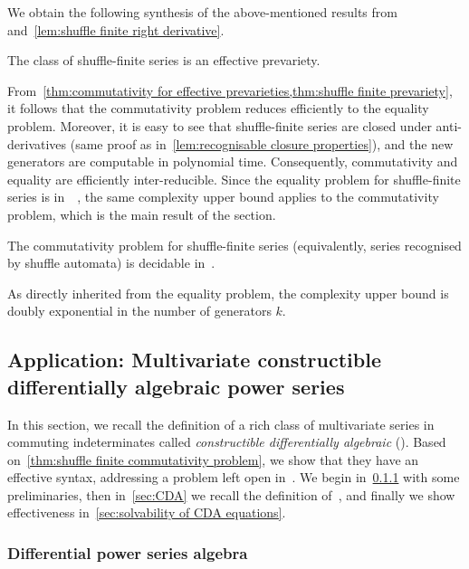 We obtain the following synthesis
of the above-mentioned results from~\cite{Clemente:CONCUR:2024}
and~\cref{lem:shuffle finite right derivative}.
%
\begin{theorem}
    \label{thm:shuffle finite prevariety}
    The class of shuffle-finite series is an effective prevariety.
\end{theorem}
%
\noindent
From~\cref{thm:commutativity for effective prevarieties,thm:shuffle finite prevariety},
it follows that the commutativity problem reduces efficiently to the equality problem.
%
Moreover, it is easy to see that shuffle-finite series are closed under anti-derivatives
(same proof as in~\cref{lem:recognisable closure properties}),
and the new generators are computable in polynomial time.
%
Consequently, commutativity and equality are efficiently inter-reducible.
%
Since the equality problem for shuffle-finite series is in~\TWOEXPSPACE~\cite[Theorem 1]{Clemente:CONCUR:2024},
the same complexity upper bound applies to the commutativity problem,
which is the main result of the section.
%
\begin{theorem}
    \label{thm:shuffle finite commutativity problem}
    The commutativity problem for shuffle-finite series (equivalently, series recognised by shuffle automata) is decidable in~\TWOEXPSPACE.
\end{theorem}
%
\noindent
As directly inherited from the equality problem,
the complexity upper bound is doubly exponential in the number of generators $k$.

\subsection{Application: Multivariate constructible differentially algebraic power series}
\label{sec:CDA algebra}

In this section, we recall the definition of a rich class of multivariate series in commuting indeterminates
called \emph{constructible differentially algebraic} (\CDA).
%
Based on~\cref{thm:shuffle finite commutativity problem},
we show that they have an effective syntax,
addressing a problem left open in~\cite[Remark 27]{Clemente:CONCUR:2024}.
%
We begin in~\cref{sec:differential power series algebra} with some preliminaries,
then in~\cref{sec:CDA} we recall the definition of~\CDA,
and finally we show effectiveness in~\cref{sec:solvability of CDA equations}.

\subsubsection{Differential power series algebra}
\label{sec:differential power series algebra}

